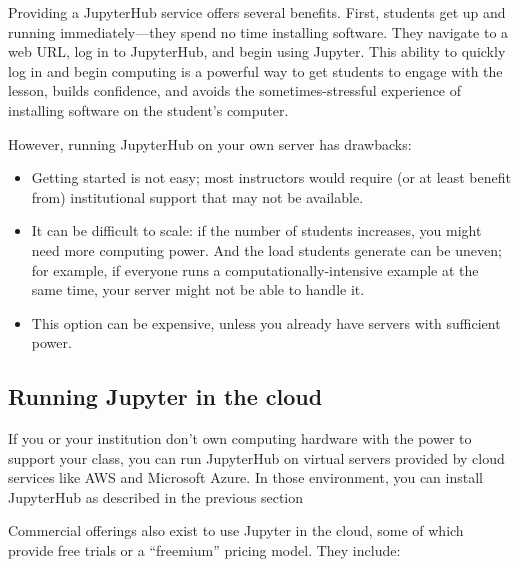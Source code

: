 \documentclass[]{book}
\begin{document}
Providing a JupyterHub service offers several benefits. First,
students get up and running immediately---they spend no time installing
software. They navigate to a web URL, log in to JupyterHub, and begin
using Jupyter. This ability to quickly log in and begin computing is a
powerful way to get students to engage with the lesson, builds
confidence, and avoids the sometimes-stressful experience of
installing software on the student's computer.

However, running JupyterHub on your own server has drawbacks:

\begin{itemize}
\item
  Getting started is not easy; most instructors would require (or at
  least benefit from) institutional support that may not be
  available.
\item
  It can be difficult to scale: if the number of students increases,
  you might need more computing power. And the load students
  generate can be uneven; for example, if everyone runs a
  computationally-intensive example at the same time, your server
  might not be able to handle it.
\item
  This option can be expensive, unless you already have servers with
  sufficient power.
\end{itemize}

\hypertarget{running-jupyter-in-the-cloud}{%
\subsection{Running Jupyter in the cloud}\label{running-jupyter-in-the-cloud}}

If you or your institution don't own computing hardware with the power
to support your class, you can run JupyterHub on virtual servers
provided by cloud services like AWS and Microsoft Azure. In those
environment, you can install JupyterHub as described in the previous
section

Commercial offerings also exist to use Jupyter in the cloud, some of
which provide free trials or a ``freemium'' pricing model. They include:
\end{document}
